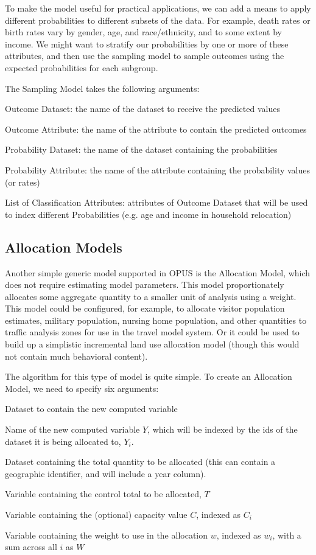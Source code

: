 To make the model useful for practical applications, we can add a means to apply different probabilities to different subsets of the data.  For example, death rates or birth rates vary by gender, age, and race/ethnicity, and to some extent by income.  We might want to stratify our probabilities by one or more of these attributes, and then use the sampling model to sample outcomes using the expected probabilities for each subgroup.

The Sampling Model takes the following arguments:

\squishlist
\item Outcome Dataset: the name of the dataset to receive the predicted values
\item Outcome Attribute: the name of the attribute to contain the predicted outcomes
\item Probability Dataset: the name of the dataset containing the probabilities
\item Probability Attribute: the name of the attribute containing the probability values (or rates)
\item List of Classification Attributes: attributes of Outcome Dataset that will be used to index different Probabilities (e.g. age and income in household relocation)
\squishend
\subsection{Allocation Models}
Another simple generic model supported in OPUS is the Allocation Model, which does not require estimating model parameters.  This model proportionately allocates some aggregate quantity to a smaller unit of analysis using a weight.  This model could be configured, for example, to allocate visitor population estimates, military population, nursing home population, and other quantities to traffic analysis zones for use in the travel model system.  Or it could be used to build up a simplistic incremental land use allocation model (though this would not contain much behavioral content).

The algorithm for this type of model is quite simple.  To create an Allocation Model, we need to specify six arguments:

\squishlist
\item Dataset to contain the new computed variable
\item Name of the new computed variable $Y$, which will be indexed by the ids of the dataset it is being allocated to, $Y_i$.
\item Dataset containing the total quantity to be allocated (this can contain a geographic identifier, and will include a year column).
\item Variable containing the control total to be allocated, $T$
\item Variable containing the (optional) capacity value $C$, indexed as $C_i$
\item Variable containing the weight to use in the allocation $w$, indexed as $w_i$, with a sum across all $i$ as $W$
\squishend

